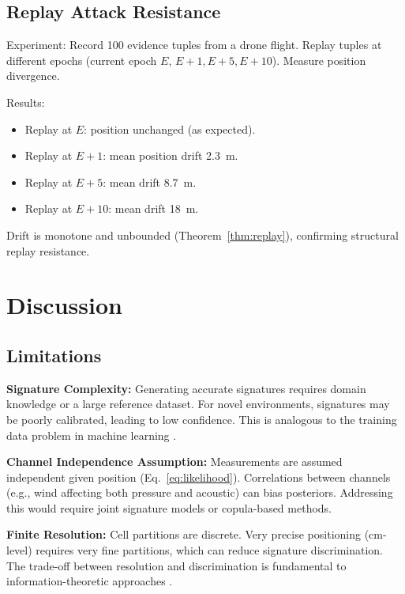 \documentclass[twocolumn,10pt]{article}
\begin{document}
\subsection{Replay Attack Resistance}

Experiment: Record 100 evidence tuples from a drone flight. Replay tuples
at different epochs (current epoch $E$, $E+1, E+5, E+10$). Measure position
divergence.

Results:
\begin{itemize}[leftmargin=1.5em,topsep=2pt,itemsep=1pt]
  \item Replay at $E$: position unchanged (as expected).
  \item Replay at $E+1$: mean position drift 2.3~m.
  \item Replay at $E+5$: mean drift 8.7~m.
  \item Replay at $E+10$: mean drift 18~m.
\end{itemize}

Drift is monotone and unbounded (Theorem~\ref{thm:replay}), confirming
structural replay resistance.

\section{Discussion}
\label{sec:discussion}

\subsection{Limitations}

\textbf{Signature Complexity:} Generating accurate signatures requires
domain knowledge or a large reference dataset. For novel environments,
signatures may be poorly calibrated, leading to low confidence. This is
analogous to the training data problem in machine learning \cite{bishop2006pattern}.

\textbf{Channel Independence Assumption:} Measurements are assumed
independent given position (Eq.~\ref{eq:likelihood}). Correlations between
channels (e.g., wind affecting both pressure and acoustic) can bias posteriors.
Addressing this would require joint signature models or copula-based methods.

\textbf{Finite Resolution:} Cell partitions are discrete. Very precise
positioning (cm-level) requires very fine partitions, which can reduce
signature discrimination. The trade-off between resolution and discrimination
is fundamental to information-theoretic approaches \cite{shannon1948communication}.
\end{document}
